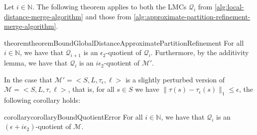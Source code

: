 \documentclass[a4paper,UKenglish,cleveref,autoref,thm-restate]{lipics-v2021}
\newcommand{\nat}{\mathbb{N}}
\newcommand{\glob}{\mathit{global}}
\newcommand{\M}{\mathcal{M}}
\newcommand{\Hyp}{\mathcal{M}'}%
\newcommand{\tauHyp}{\tau_{\epsilon}}
\newcommand{\Q}{\mathcal{Q}}
\begin{document}


Let $i \in \nat$. The following theorem applies to both the LMCs $\Q_{i}$ from \cref{alg:local-distance-merge-algorithm} and those from \cref{alg:approximate-partition-refinement-merge-algorithm}.
\begin{restatable}{theorem}{theoremBoundGlobalDistanceApproximatePartitionRefinement}\label{theorem:bounding-global-distance}
 For all $i \in \nat$, we have that $\Q_{i+1}$ is an $\epsilon_2$-quotient of $\Q_i$. Furthermore, by the additivity lemma, we have that $\Q_i$ is an $i\epsilon_2$-quotient of $\Hyp$. %
\end{restatable}

In the case that $\Hyp=<S, L, \tauHyp, \ell>$ is a slightly perturbed version of $\M = <S, L,\tau,\ell>$, that is, for all $s \in S$ we have $\|\tau(s) - \tauHyp(s)\|_1 \le \epsilon$, the following corollary holds:
\begin{restatable}{corollary}{corollaryBoundQuotientError}\label{corollary:bounding-quotient-error}
 For all $i \in \nat$, we have that $\Q_i$ is an $(\epsilon + i\epsilon_2)$-quotient of $\M$.
\end{restatable}

\end{document}
